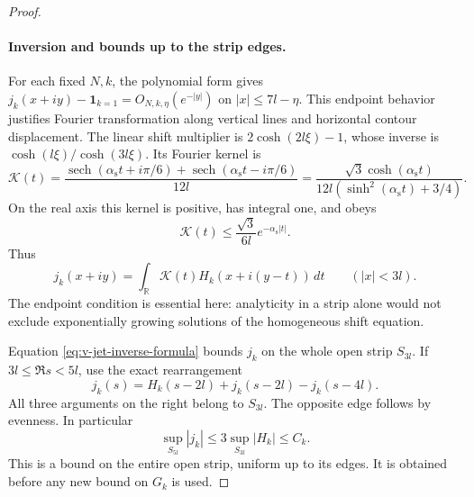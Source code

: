 \begin{proof}
\paragraph{Inversion and bounds up to the strip edges.}
For each fixed $N,k$, the polynomial form gives
$j_k(x+iy)-\mathbf1_{k=1}=O_{N,k,\eta}(e^{-|y|})$ on
$|x|\le7 l-\eta$.  This endpoint behavior justifies Fourier
transformation along vertical lines and horizontal contour displacement.
The linear shift multiplier is $2\cosh(2 l\xi)-1$, whose inverse is
$\cosh( l\xi)/\cosh(3 l\xi)$.  Its Fourier kernel is
\begin{equation}\label{eq:v-jet-inverse-kernel}
 \mathcal K(t)=
 \frac{\operatorname{sech}(\alpha_{\mathrm s}t+i\pi/6)
       +\operatorname{sech}(\alpha_{\mathrm s}t-i\pi/6)}{12 l}
 =\frac{\sqrt3\cosh(\alpha_{\mathrm s}t)}
        {12 l(\sinh^2(\alpha_{\mathrm s}t)+3/4)}.
\end{equation}
On the real axis this kernel is positive, has integral one, and obeys
\[
 \mathcal K(t)\le\frac{\sqrt3}{6 l}
                           e^{-\alpha_{\mathrm s}|t|}.
\]
Thus
\begin{equation}\label{eq:v-jet-inverse-formula}
 j_k(x+iy)=\int_{\mathbb R}\mathcal K(t)
                       H_k(x+i(y-t))\,dt\qquad(|x|<3 l).
\end{equation}
The endpoint condition is essential here: analyticity in a strip alone
would not exclude exponentially growing solutions of the homogeneous
shift equation.

Equation \eqref{eq:v-jet-inverse-formula} bounds $j_k$ on the whole
open strip $S_{3 l}$.  If $3 l\le\Re s<5 l$, use the exact
rearrangement
\begin{equation}\label{eq:v-jet-edge-rearrangement}
 j_k(s)=H_k(s-2 l)+j_k(s-2 l)-j_k(s-4 l).
\end{equation}
All three arguments on the right belong to $S_{3 l}$.  The opposite
edge follows by evenness.  In particular
\[
 \sup_{S_{5 l}}|j_k|\le3\sup_{S_{3 l}}|H_k|\le C_k.
\]
This is a bound on the entire open strip, uniform up to its edges.
It is obtained before any new bound on $G_k$ is used.


\end{proof}
